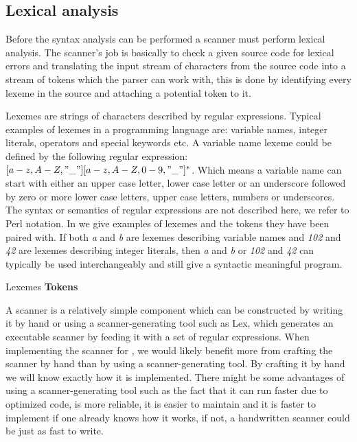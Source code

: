 \subsection{Lexical analysis}
\label{sec:lexicalanalysis}
Before the syntax analysis can be performed a scanner must perform lexical
analysis. The scanner's job is basically to check a given source code for lexical
errors and translating the input stream of characters from the source code into
a stream of tokens which the parser can work with, this
is done by identifying every lexeme in the source and attaching a potential
token to it.
\cite[p. 57]{fischer2009}

Lexemes are strings of characters described by regular expressions.
Typical examples of lexemes in a programming language are: variable
names, integer literals, operators and special keywords etc. A
variable name lexeme could be defined by the following regular
expression: $[a-z, A-Z, "\_"][a-z, A-Z, 0-9, "\_"]^*$. Which means a
variable name can start with either an upper case letter, lower case
letter or an underscore followed by zero or more lower case letters,
upper case letters, numbers or underscores. The syntax or semantics
of regular expressions are not described here, we refer to Perl
notation\cite{perlRegex}. In  we give
examples of lexemes and the tokens they have been paired with. If both
\textit{a} and \textit{b} are lexemes describing variable names and
\textit{102} and \textit{42} are lexemes describing integer literals,
then \textit{a} and \textit{b} or \textit{102} and \textit{42} can
typically be used interchangeably and still give a syntactic meaningful
program.

		             {               }
       {Lexemes             }{\textbf{Tokens} } {
}

A scanner is a relatively simple component which can be constructed
by writing it by hand or using a scanner-generating tool such as Lex,
which generates an executable scanner by feeding it with a set of
regular expressions. When implementing the scanner for \productname{},
we would likely benefit more from crafting the scanner by hand than by
using a scanner-generating tool. By crafting it by hand we will know
exactly how it is implemented. There might be some advantages of using
a scanner-generating tool such as the fact that it can run faster due
to optimized code, is more reliable, it is easier to maintain and it
is faster to implement if one already knows how it works, if not, a
handwritten scanner could be just as fast to write.
